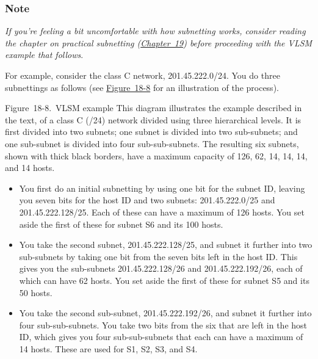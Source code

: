 \documentclass[b5paper,11pt]{memoir}
\begin{document}
\subsubsection[Note]{\texorpdfstring{\protect\hypertarget{ch18s08.htmlux5cux23note-75}{}{}Note}{Note}}

{\emph{If you're feeling a bit uncomfortable with how subnetting works,
consider reading the chapter on practical subnetting
(\protect\hyperlink{ch19.html}{Chapter~19}) before proceeding with the
VLSM example that follows}}.

For example, consider the class C network, 201.45.222.0/24. You do three
subnettings as follows (see
\protect\hyperlink{ch18s08.htmlux5cux23vlsm_example_this_diagram_illustrates_th}{Figure~18-8}
for an illustration of the process).

\protect\hypertarget{ch18s08.htmlux5cux23vlsm_example_this_diagram_illustrates_th}{}{}

\protect\hypertarget{ch18s08.htmlux5cux23I_mediaobject4_d1e20490}{}{}

Figure~18-8.~VLSM example This diagram illustrates the example described
in the text, of a class C (/24) network divided using three hierarchical
levels. It is first divided into two subnets; one subnet is divided into
two sub-subnets; and one sub-subnet is divided into four
sub-sub-subnets. The resulting six subnets, shown with thick black
borders, have a maximum capacity of 126, 62, 14, 14, 14, and 14 hosts.

\begin{itemize}
\item
  You first do an initial subnetting by using one bit for the subnet ID,
  leaving you seven bits for the host ID and two subnets:
  201.45.222.0/25 and 201.45.222.128/25. Each of these can have a
  maximum of 126 hosts. You set aside the first of these for subnet S6
  and its 100 hosts.
\item
  You take the second subnet, 201.45.222.128/25, and subnet it further
  into two sub-subnets by taking one bit from the seven bits left in the
  host ID. This gives you the sub-subnets 201.45.222.128/26 and
  201.45.222.192/26, each of which can have 62 hosts. You set aside the
  first of these for subnet S5 and its 50 hosts.
\item
  You take the second sub-subnet, 201.45.222.192/26, and subnet it
  further into four sub-sub-subnets. You take two bits from the six that
  are left in the host ID, which gives you four sub-sub-subnets that
  each can have a maximum of 14 hosts. These are used for S1, S2, S3,
  and S4.
\end{itemize}
\end{document}
